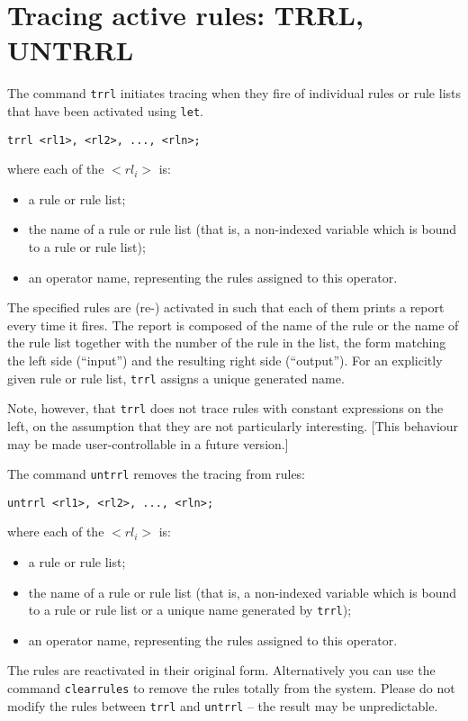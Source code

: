 \section{Tracing active rules: TRRL, UNTRRL}

\hypertarget{command:TRRL}{}
\hypertarget{command:UNTRRL}{}
The command \texttt{trrl} initiates tracing when they fire of
individual rules or rule lists that have been activated using
\texttt{let}.
\begin{verbatim}
trrl <rl1>, <rl2>, ..., <rln>;
\end{verbatim}
where each of the $<rl_i>$ is:
\begin{itemize}
\item a rule or rule list;
\item the name of a rule or rule list (that is, a non-indexed variable
      which is bound to a rule or rule list);
\item an operator name, representing the rules assigned to this
      operator.
\end{itemize}
The specified rules are (re-) activated in \REDUCE{} such that each of
them prints a report every time it fires.  The report is composed of
the name of the rule or the name of the rule list together with the
number of the rule in the list, the form matching the left side
(``input'') and the resulting right side (``output'').  For an
explicitly given rule or rule list, \texttt{trrl} assigns a unique
generated name.

Note, however, that \texttt{trrl} does not trace rules with constant
expressions on the left, on the assumption that they are not
particularly interesting.  [This behaviour may be made
user-controllable in a future version.]

The command \texttt{untrrl} removes the tracing from rules:
\begin{verbatim}
untrrl <rl1>, <rl2>, ..., <rln>;
\end{verbatim}
where each of the $<rl_i>$ is:
\begin{itemize}
\item a rule or rule list;
\item the name of a rule or rule list (that is, a non-indexed variable
which is bound to a rule or rule list or a unique name generated by
\texttt{trrl});
\item an operator name, representing the rules assigned to this
operator.
\end{itemize}
The rules are reactivated in their original form.  Alternatively you
can use the command \texttt{clearrules} to remove the rules totally
from the system.  Please do not modify the rules between \texttt{trrl}
and \texttt{untrrl} -- the result may be unpredictable.


